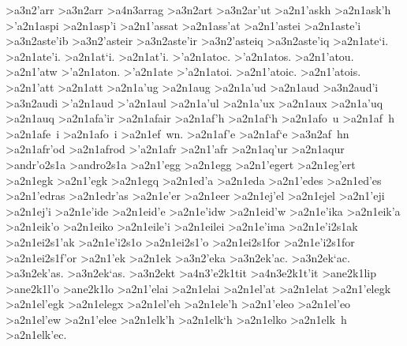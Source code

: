 {	>a3n2'arr 		%
	>a3n2arr  		
		>a4n3arrag 		%
	>a3n2art		%
	>a3n2ar'ut		%
>a2n1'askh 		%
>a2n1ask'h
>'a2n1aspi 		%
>a2n1asp'i
>a2n1'assat 		%
>a2n1ass'at
>a2n1'astei 		%
>a2n1aste'i
	>a3n2aste'ib    	%
	>a3n2'asteir		%
	>a3n2aste'ir
	>a3n2'asteiq		%
	>a3n2aste'iq
>a2n1ate`i. 		%
>a2n1ate'i.
>a2n1at`i. 		%
>a2n1at'i.
>'a2n1atoc.		%
>'a2n1atos.
>a2n1'atou.
>a2n1'atw
>'a2n1aton.
>'a2n1ate
>'a2n1atoi.
>a2n1'atoic.
>a2n1'atois.	
>a2n1'att 		%
>a2n1att
>a2n1a'ug 		%
>a2n1aug
>a2n1a'ud 		%
>a2n1aud
	>a3n2aud'i 		%
	>a3n2audi
>'a2n1aud 		%
>'a2n1aul 		%
>a2n1a'ul
>a2n1a'ux 		%
>a2n1aux 
>a2n1a'uq 		%
>a2n1auq
>a2n1afa'ir 		%
>a2n1afair
>a2n1af'h		%
>a2n1af`h 
>a2n1afo~u
>a2n1af~h		
>a2n1afe~i
>a2n1afo~i 
>a2n1ef~wn.
>a2n1af'e
>a2n1af`e
	>a3n2af~hn		%
>a2n1afr'od 		%
>a2n1afrod
>'a2n1afr    		%
>a2n1'afr
>a2n1aq'ur 		%
>a2n1aqur
>andr'o2s1a 		%
>andro2s1a
>a2n1'egg 		%
>a2n1egg
>a2n1'egert 		%
>a2n1eg'ert
>a2n1egk 		%
>a2n1'egk 		%
>a2n1egq  		%
>a2n1ed'a 		%
>a2n1eda
>a2n1'edes 		%
>a2n1ed'es
>a2n1'edras 		%
>a2n1edr'as
>a2n1e'er 		%
>a2n1eer
>a2n1ej'el  		%
>a2n1ejel
>a2n1'eji 		%
>a2n1ej'i
>a2n1e'ide 		%
>a2n1eid'e
>a2n1e'idw 		%
>a2n1eid'w
>a2n1e'ika 		%
>a2n1eik'a
>a2n1eik'o 		%
>a2n1eiko
>a2n1eile'i 		%
>a2n1eilei
>a2n1e'ima 		%
>a2n1e'i2s1ak  		%
>a2n1ei2s1'ak
>a2n1e'i2s1o  		%
>a2n1ei2s1'o
>a2n1ei2s1for 		%
>a2n1e'i2s1for 		%
>a2n1ei2s1f'or
>a2n1'ek   		%
>a2n1ek
	>a3n2'eka 		%
	>a3n2ek'ac. 		%
	>a3n2ek`ac.
	>a3n2ek'as.
	>a3n2ek`as.
	>a3n2ekt 		%
		>a4n3'e2k1tit		%
		>a4n3e2k1t'it
>ane2k1lip 		%
>ane2k1l'o		%
>ane2k1lo
>a2n1'elai   		%
>a2n1elai
>a2n1el'at		%
>a2n1elat
>a2n1'elegk		%
>a2n1el'egk
>a2n1elegx		%
>a2n1el'eh   		%
>a2n1ele'h
>a2n1'eleo		%
>a2n1el'eo
>a2n1el'ew
>a2n1'elee
>a2n1elk'h 		%
>a2n1elk`h
>a2n1elko
>a2n1elk~h
>a2n1elk'ec.
}
